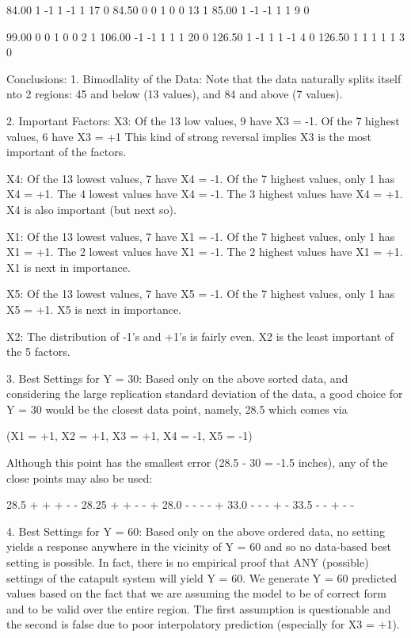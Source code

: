  84.00     1  -1   1  -1   1  17     0
 84.50     0   0   1   0   0  13     1
 85.00     1  -1  -1   1   1   9     0

 99.00     0   0   1   0   0   2     1
106.00    -1  -1   1   1   1  20     0
126.50     1  -1   1   1  -1   4     0
126.50     1   1   1   1   1   3     0


Conclusions:
   1. Bimodlality of the Data: Note that the data
      naturally splits itself nto 2 regions: 45
      and below (13 values), and 84 and above (7
      values).

   2. Important Factors:
      X3: Of the 13 low values, 9 have X3 = -1.
          Of the 7 highest values, 6 have X3 = +1
          This kind of strong reversal implies X3 is
          the most important of the factors.

      X4: Of the 13 lowest values, 7 have X4 = -1.
          Of the 7 highest values, only 1 has X4 = +1.
          The 4 lowest values have X4 = -1.
          The 3 highest values have X4 = +1.
          X4 is also important (but next so).

      X1: Of the 13 lowest values, 7 have X1 = -1.
          Of the 7 highest values, only 1 has X1 = +1.
          The 2 lowest values have X1 = -1.
          The 2 highest values have X1 = +1.
          X1 is next in importance.

      X5: Of the 13 lowest values, 7 have X5 = -1.
          Of the 7 highest values, only 1 has X5 = +1.
          X5 is next in importance.

      X2: The distribution of -1's and +1's
          is fairly even.
          X2 is the least important of the 5 factors.

   3. Best Settings for Y = 30:
      Based only on the above sorted data, and
      considering the large replication standard
      deviation of the data, a good choice for Y =
      30 would be the closest data point, namely,
      28.5 which comes via

         (X1 = +1, X2 = +1, X3 = +1, X4 = -1, X5 = -1)

      Although this point has the smallest error
      (28.5 - 30 = -1.5 inches), any of the close
      points may also be used:

            28.5     + + + - -
            28.25    + + - - +
            28.0     - - - - +
            33.0     - - - + -
            33.5     - - + - -

   4. Best Settings for Y = 60:
      Based only on the above ordered data, no
      setting yields a response anywhere in the
      vicinity of Y = 60 and so no data-based
      best setting is possible.  In fact, there is no
      empirical proof that ANY (possible) settings
      of the catapult system will yield Y = 60.
      We generate Y = 60 predicted values based on
      the fact that we are assuming the model to
      be of correct form and to be valid over the entire
      region.  The first assumption is
      questionable and the second is false due to
      poor interpolatory prediction (especially
      for X3 = +1).

